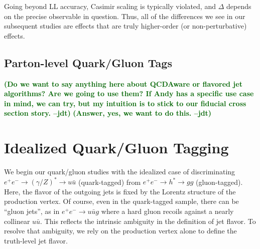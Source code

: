 \documentclass[11pt,letterpaper]{article}
\newcommand{\jdt}[1]{\textbf{\textcolor{darkgreen}{(#1 --jdt)}}}
\begin{document}
Going beyond LL accuracy, Casimir scaling is typically violated, and $\Delta$ depends on the precise observable in question.  Thus, all of the differences we see in our subsequent studies are effects that are truly higher-order (or non-perturbative) effects.

\subsection{Parton-level Quark/Gluon Tags}

\jdt{Do we want to say anything here about QCDAware or flavored jet algorithms?  Are we going to use them?  If Andy has a specific use case in mind, we can try, but my intuition is to stick to our fiducial cross section story.}  \jdt{Answer, yes, we want to do this.}

\section{Idealized Quark/Gluon Tagging}
\label{sec:ee}

We begin our quark/gluon studies with the idealized case of discriminating $e^+ e^- \to (\gamma/Z)^* \to u \bar{u}$ (quark-tagged) from $e^+ e^- \to h^* \to gg$ (gluon-tagged).  Here, the flavor of the outgoing jets is fixed by the Lorentz structure of the production vertex.  Of course, even in the quark-tagged sample, there can be ``gluon jets'', as in $e^+ e^- \to u \bar{u} g$ where a hard gluon recoils against a nearly collinear $u \bar{u}$.  This reflects the intrinsic ambiguity in the definition of jet flavor.   To resolve that ambiguity, we rely on the production vertex alone to define the truth-level jet flavor.
\end{document}

